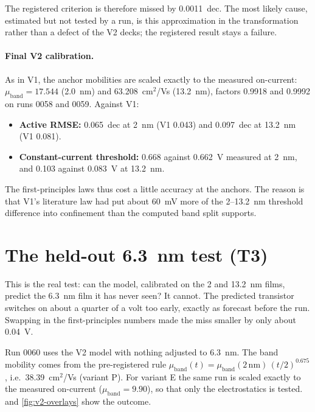The registered criterion is therefore missed by 0.0011~dec. The most likely cause, estimated but not tested by a run, is this approximation in the
transformation rather than a defect of the V2 decks; the registered result stays a failure.

\paragraph{Final V2 calibration.} As in V1, the anchor mobilities are scaled exactly to the measured on-current:
$\mu_{\mathrm{band}} = 17.544$ (2.0~nm) and 63.208~cm$^2$/Vs (13.2~nm), factors 0.9918 and 0.9992 on runs 0058 and
0059. Against V1:
\begin{itemize}
\item \textbf{Active RMSE:} 0.065~dec at 2~nm (V1 0.043) and 0.097~dec at 13.2~nm (V1 0.081).
\item \textbf{Constant-current threshold:} 0.668 against 0.662~V measured at 2~nm, and 0.103 against 0.083~V at
13.2~nm.
\end{itemize}
The first-principles laws thus cost a little accuracy at the anchors. The reason is that V1's literature law had put
about 60~mV more of the 2--13.2~nm threshold difference into confinement than the computed band split supports.

\section{The held-out 6.3~nm test (T3)}
\label{sec:v2-test}

\begin{v2plain}
This is the real test: can the model, calibrated on the 2 and 13.2~nm films, predict the 6.3~nm film it has never
seen? It cannot. The predicted transistor switches on about a quarter of a volt too early, exactly as forecast before
the run. Swapping in the first-principles numbers made the miss smaller by only about 0.04~V.
\end{v2plain}

Run 0060 uses the V2 model with nothing adjusted to 6.3~nm. The band mobility comes from the pre-registered rule
$\mu_{\mathrm{band}}(t) = \mu_{\mathrm{band}}(2\,\mathrm{nm})\,(t/2)^{0.675}$, i.e.\ 38.39~cm$^2$/Vs (variant P). For
variant E the same run is scaled exactly to the measured on-current ($\mu_{\mathrm{band}} = 9.90$), so that only the
electrostatics is tested.  and \cref{fig:v2-overlays} show the outcome.

